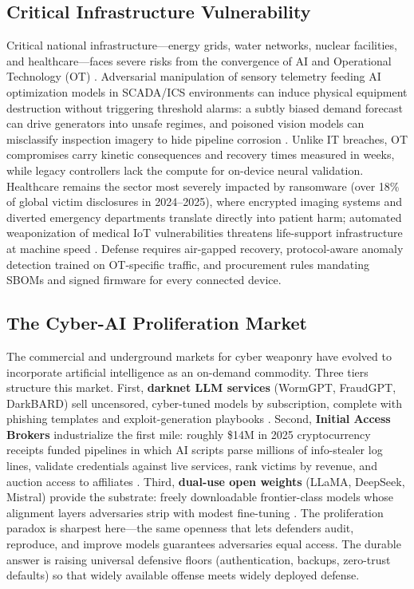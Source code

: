 \documentclass[conference,10pt,twocolumn,a4paper]{IEEEtran}
\begin{document}
\subsection{Critical Infrastructure Vulnerability}
Critical national infrastructure---energy grids, water networks, nuclear facilities, and healthcare---faces severe risks from the convergence of AI and Operational Technology (OT) \cite{cisa_ot_ai_2025}. Adversarial manipulation of sensory telemetry feeding AI optimization models in SCADA/ICS environments can induce physical equipment destruction without triggering threshold alarms: a subtly biased demand forecast can drive generators into unsafe regimes, and poisoned vision models can misclassify inspection imagery to hide pipeline corrosion \cite{cisa_ot_ai_2025}. Unlike IT breaches, OT compromises carry kinetic consequences and recovery times measured in weeks, while legacy controllers lack the compute for on-device neural validation. Healthcare remains the sector most severely impacted by ransomware (over 18\% of global victim disclosures in 2024--2025), where encrypted imaging systems and diverted emergency departments translate directly into patient harm; automated weaponization of medical IoT vulnerabilities threatens life-support infrastructure at machine speed \cite{blackkite_ransomware_2025, sophos_ransomware_2025}. Defense requires air-gapped recovery, protocol-aware anomaly detection trained on OT-specific traffic, and procurement rules mandating SBOMs and signed firmware for every connected device.

\subsection{The Cyber-AI Proliferation Market}
The commercial and underground markets for cyber weaponry have evolved to incorporate artificial intelligence as an on-demand commodity. Three tiers structure this market. First, \textbf{darknet LLM services} (WormGPT, FraudGPT, DarkBARD) sell uncensored, cyber-tuned models by subscription, complete with phishing templates and exploit-generation playbooks \cite{slashnext_genai_2025}. Second, \textbf{Initial Access Brokers} industrialize the first mile: roughly \$14M in 2025 cryptocurrency receipts funded pipelines in which AI scripts parse millions of info-stealer log lines, validate credentials against live services, rank victims by revenue, and auction access to affiliates \cite{chainalysis_crypto_crime_2026}. Third, \textbf{dual-use open weights} (LLaMA, DeepSeek, Mistral) provide the substrate: freely downloadable frontier-class models whose alignment layers adversaries strip with modest fine-tuning \cite{cisa_aa26_251a, zou2023universal}. The proliferation paradox is sharpest here---the same openness that lets defenders audit, reproduce, and improve models guarantees adversaries equal access. The durable answer is raising universal defensive floors (authentication, backups, zero-trust defaults) so that widely available offense meets widely deployed defense.
\end{document}

